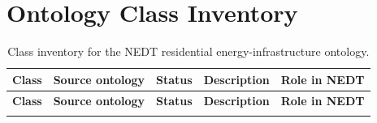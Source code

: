\documentclass[preprint,12pt]{elsarticle}
\begin{document}
\newpage

\appendix

\section{Ontology Class Inventory}
\label{app:class-inventory}

\renewcommand{\arraystretch}{1.15}

\begin{longtable}{P{2.7cm} P{2cm} P{2.2cm} P{4cm} P{3.4cm}}
\caption{Class inventory for the NEDT residential energy-infrastructure
  ontology.}
\label{tab:class_inventory}\\
\hline
\textbf{Class} & \textbf{Source ontology} & \textbf{Status} &
\textbf{Description} & \textbf{Role in NEDT} \\
\hline
\endfirsthead
\hline
\textbf{Class} & \textbf{Source ontology} & \textbf{Status} &
\textbf{Description} & \textbf{Role in NEDT} \\
\hline
\endhead
\hline
\endfoot


\end{longtable}
\end{document}
